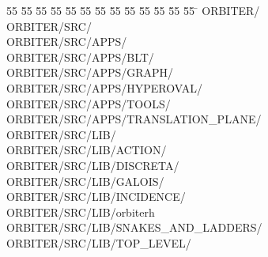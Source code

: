 %
%
\begin{tabbing}
55 \= 55 \= 55 \= 55 \= 55 \= 55 \= 55 \= 55 \= 55 \= 55 \= 55 \= 55 \= 55 \= \kill
ORBITER/\\[0pt]
ORBITER/SRC/\\[0pt]
ORBITER/SRC/APPS/\\[0pt]
ORBITER/SRC/APPS/BLT/\\[0pt]
ORBITER/SRC/APPS/GRAPH/\\[0pt]
ORBITER/SRC/APPS/HYPEROVAL/\\[0pt]
ORBITER/SRC/APPS/TOOLS/\\[0pt]
ORBITER/SRC/APPS/TRANSLATION\_PLANE/\\[0pt]
ORBITER/SRC/LIB/\\[0pt]
ORBITER/SRC/LIB/ACTION/\\[0pt]
ORBITER/SRC/LIB/DISCRETA/\\[0pt]
ORBITER/SRC/LIB/GALOIS/\\[0pt]
ORBITER/SRC/LIB/INCIDENCE/\\[0pt]
ORBITER/SRC/LIB/orbiterh\\[0pt]
ORBITER/SRC/LIB/SNAKES\_AND\_LADDERS/\\[0pt]
ORBITER/SRC/LIB/TOP\_LEVEL/\\[0pt]
\\[0pt]
\end{tabbing}
